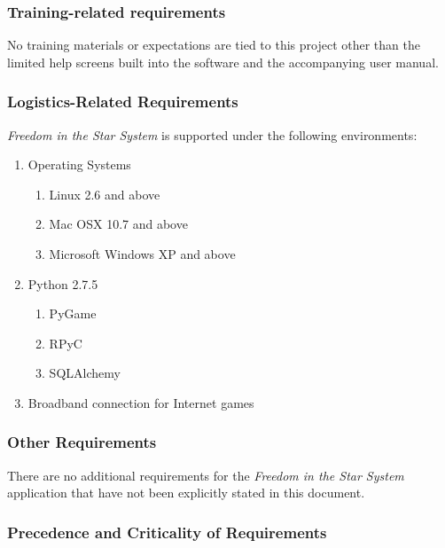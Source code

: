 \documentclass[twoside,letterpaper]{article}
\begin{document}
\subsubsection{Training-related requirements}

No training materials or expectations are tied to this project other
than the limited help screens built into the software and the
accompanying user manual.

\subsubsection{Logistics-Related Requirements}
\textit{Freedom in the Star System} is supported under the following environments:
\begin{enumerate}
	\item Operating Systems
	\begin{enumerate}
		\item Linux 2.6 and above
		\item Mac OSX 10.7 and above
		\item Microsoft Windows XP and above
	\end{enumerate}
	\item Python 2.7.5
	\begin{enumerate}
		\item PyGame
		\item RPyC
		\item SQLAlchemy
	\end{enumerate}
	\item Broadband connection for Internet games
\end{enumerate}

\subsubsection{Other Requirements}
There are no additional requirements for the \textit{Freedom in the Star System} application that have not been explicitly stated in this document.

\subsubsection{Precedence and Criticality of Requirements}
\end{document}
